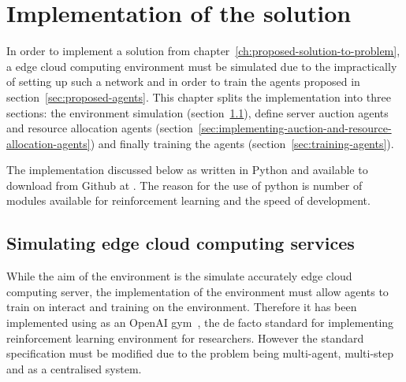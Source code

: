 \chapter{Implementation of the solution}\label{ch:implementation-of-the-solution}
In order to implement a solution from chapter~\ref{ch:proposed-solution-to-problem}, a edge cloud computing environment
must be simulated due to the impractically of setting up such a network and in order to train the agents proposed
in section~\ref{sec:proposed-agents}. This chapter splits the implementation into three sections: the environment
simulation (section~\ref{sec:simulating-edge-cloud-computing-services}), define server auction agents and resource
allocation agents (section~\ref{sec:implementing-auction-and-resource-allocation-agents}) and finally training the
agents (section~\ref{sec:training-agents}).

The implementation discussed below as written in Python and available to download from Github at
. The reason for the use of python is number
of modules available for reinforcement learning and the speed of development.

\section{Simulating edge cloud computing services}\label{sec:simulating-edge-cloud-computing-services}
While the aim of the environment is the simulate accurately edge cloud computing server, the implementation of the
environment must allow agents to train on interact and training on the environment. Therefore it has been implemented
using as an OpenAI gym~\citep{openaigym}, the de facto standard for implementing reinforcement learning
environment for researchers. However the standard specification must be modified due to the problem being multi-agent,
multi-step and as a centralised system.


